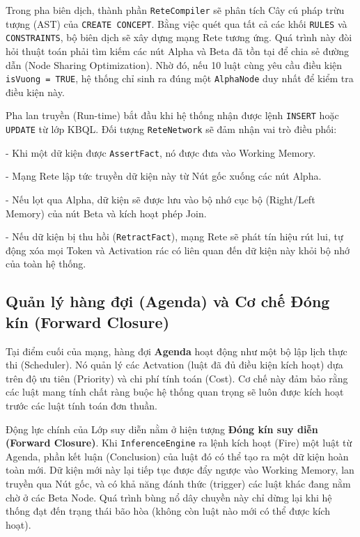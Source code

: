 \documentclass[13pt,a4paper,oneside]{extreport}
\begin{document}
Trong pha biên dịch, thành phần \texttt{ReteCompiler} sẽ phân tích Cây cú pháp trừu tượng (AST) của \texttt{CREATE CONCEPT}. Bằng việc quét qua tất cả các khối \texttt{RULES} và \texttt{CONSTRAINTS}, bộ biên dịch sẽ xây dựng mạng Rete tương ứng. Quá trình này đòi hỏi thuật toán phải tìm kiếm các nút Alpha và Beta đã tồn tại để chia sẻ đường dẫn (Node Sharing Optimization). Nhờ đó, nếu 10 luật cùng yêu cầu điều kiện \texttt{isVuong = TRUE}, hệ thống chỉ sinh ra đúng một \texttt{AlphaNode} duy nhất để kiểm tra điều kiện này.


Pha lan truyền (Run-time) bắt đầu khi hệ thống nhận được lệnh \texttt{INSERT} hoặc \texttt{UPDATE} từ lớp KBQL. Đối tượng \texttt{ReteNetwork} sẽ đảm nhận vai trò điều phối:\par
- Khi một dữ kiện được \texttt{AssertFact}, nó được đưa vào Working Memory.\par
- Mạng Rete lập tức truyền dữ kiện này từ Nút gốc xuống các nút Alpha.\par
- Nếu lọt qua Alpha, dữ kiện sẽ được lưu vào bộ nhớ cục bộ (Right/Left Memory) của nút Beta và kích hoạt phép Join.\par
- Nếu dữ kiện bị thu hồi (\texttt{RetractFact}), mạng Rete sẽ phát tín hiệu rút lui, tự động xóa mọi Token và Activation rác có liên quan đến dữ kiện này khỏi bộ nhớ của toàn hệ thống.


\subsection{Quản lý hàng đợi (Agenda) và Cơ chế Đóng kín (Forward Closure)}


Tại điểm cuối của mạng, hàng đợi \textbf{Agenda} hoạt động như một bộ lập lịch thực thi (Scheduler). Nó quản lý các Actvation (luật đã đủ điều kiện kích hoạt) dựa trên độ ưu tiên (Priority) và chi phí tính toán (Cost). Cơ chế này đảm bảo rằng các luật mang tính chất ràng buộc hệ thống quan trọng sẽ luôn được kích hoạt trước các luật tính toán đơn thuần.


Động lực chính của Lớp suy diễn nằm ở hiện tượng \textbf{Đóng kín suy diễn (Forward Closure)}. Khi \texttt{InferenceEngine} ra lệnh kích hoạt (Fire) một luật từ Agenda, phần kết luận (Conclusion) của luật đó có thể tạo ra một dữ kiện hoàn toàn mới. Dữ kiện mới này lại tiếp tục được đẩy ngược vào Working Memory, lan truyền qua Nút gốc, và có khả năng đánh thức (trigger) các luật khác đang nằm chờ ở các Beta Node. Quá trình bùng nổ dây chuyền này chỉ dừng lại khi hệ thống đạt đến trạng thái bão hòa (không còn luật nào mới có thể được kích hoạt).
\end{document}
